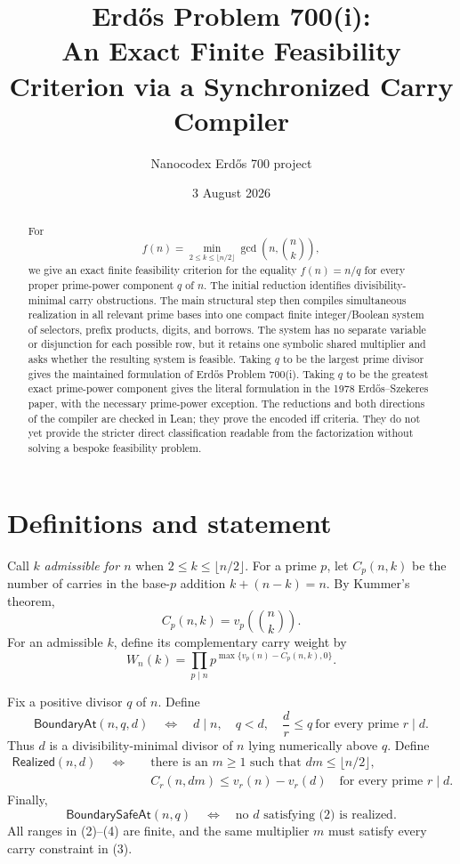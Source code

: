 \documentclass[11pt]{article}
\title{Erd\H{o}s Problem 700(i):\\
An Exact Finite Feasibility Criterion via a Synchronized Carry Compiler}
\author{Nanocodex Erd\H{o}s 700 project}
\date{3 August 2026}
\theoremstyle{remark}
\newcommand{\choosef}[2]{\binom{#1}{#2}}
\newcommand{\BoundaryAt}{\mathsf{BoundaryAt}}
\newcommand{\Realized}{\mathsf{Realized}}
\newcommand{\BoundarySafeAt}{\mathsf{BoundarySafeAt}}
\begin{document}
\maketitle

\begin{abstract}
For
\[
 f(n)=\min_{2\leq k\leq \lfloor n/2\rfloor}
       \gcd\!\left(n,\choosef nk\right),
\]
we give an exact finite feasibility criterion for the equality $f(n)=n/q$
for every proper prime-power component $q$ of $n$.  The initial reduction
identifies divisibility-minimal carry obstructions.  The main structural step
then compiles simultaneous realization in all relevant prime bases into one
compact finite integer/Boolean system of selectors, prefix products, digits,
and borrows.  The system has no separate variable or disjunction for each
possible row, but it retains one symbolic shared multiplier and asks whether
the resulting system is feasible.  Taking $q$ to be the largest prime divisor gives the
maintained formulation of Erd\H{o}s Problem 700(i).  Taking $q$ to be the
greatest exact prime-power component gives the literal formulation in the
1978 Erd\H{o}s--Szekeres paper, with the necessary prime-power exception.
The reductions and both directions of the compiler are checked in Lean;
they prove the encoded iff criteria.  They do not yet provide the stricter
direct classification readable from the factorization without solving a
bespoke feasibility problem.
\end{abstract}

\section{Definitions and statement}

Call $k$ \emph{admissible for $n$} when
$2\leq k\leq\lfloor n/2\rfloor$.  For a prime $p$, let
$C_p(n,k)$ be the number of carries in the base-$p$ addition
$k+(n-k)=n$.  By Kummer's theorem,
\[
 C_p(n,k)=v_p\!\left(\choosef nk\right).
\]
For an admissible $k$, define its complementary carry weight by
\[
 W_n(k)=\prod_{p\mid n}p^{\max\{v_p(n)-C_p(n,k),0\}}.       \tag{1}
\]

Fix a positive divisor $q$ of $n$.  Define
\[
 \BoundaryAt(n,q,d)
 \quad\Longleftrightarrow\quad
 d\mid n,\quad q<d,\quad
 \frac d r\leq q\ \text{for every prime }r\mid d.          \tag{2}
\]
Thus $d$ is a divisibility-minimal divisor of $n$ lying numerically above
$q$.  Define
\begin{equation}
 \begin{split}
 \Realized(n,d)\quad\Longleftrightarrow\quad
 &\text{there is an }m\geq1\text{ such that }dm\leq\lfloor n/2\rfloor,\\
 &C_r(n,dm)\leq v_r(n)-v_r(d)
   \quad\text{for every prime }r\mid d.
 \end{split}
\tag{3}
\end{equation}
Finally,
\[
 \BoundarySafeAt(n,q)
 \quad\Longleftrightarrow\quad
 \text{no }d\text{ satisfying (2) is realized}.            \tag{4}
\]
All ranges in (2)--(4) are finite, and the same multiplier $m$ must satisfy
every carry constraint in (3).
\end{document}
